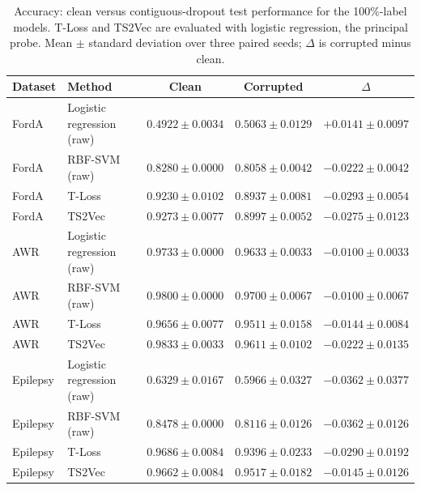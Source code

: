 \documentclass[a4paper,11pt]{article}
\begin{document}
\begin{table}[htbp]
    \centering
    \small
    \begin{tabular}{l l c c c}
        \toprule
        Dataset & Method & Clean & Corrupted & $\Delta$ \\
        \midrule
        FordA & Logistic regression (raw) & $0.4922 \pm 0.0034$ & $0.5063 \pm 0.0129$ & $+0.0141 \pm 0.0097$ \\
        FordA & RBF-SVM (raw)             & $0.8280 \pm 0.0000$ & $0.8058 \pm 0.0042$ & $-0.0222 \pm 0.0042$ \\
        FordA & T-Loss                    & $0.9230 \pm 0.0102$ & $0.8937 \pm 0.0081$ & $-0.0293 \pm 0.0054$ \\
        FordA & TS2Vec                    & $0.9273 \pm 0.0077$ & $0.8997 \pm 0.0052$ & $-0.0275 \pm 0.0123$ \\
        \midrule
        AWR & Logistic regression (raw) & $0.9733 \pm 0.0000$ & $0.9633 \pm 0.0033$ & $-0.0100 \pm 0.0033$ \\
        AWR & RBF-SVM (raw)             & $0.9800 \pm 0.0000$ & $0.9700 \pm 0.0067$ & $-0.0100 \pm 0.0067$ \\
        AWR & T-Loss                    & $0.9656 \pm 0.0077$ & $0.9511 \pm 0.0158$ & $-0.0144 \pm 0.0084$ \\
        AWR & TS2Vec                    & $0.9833 \pm 0.0033$ & $0.9611 \pm 0.0102$ & $-0.0222 \pm 0.0135$ \\
        \midrule
        Epilepsy & Logistic regression (raw) & $0.6329 \pm 0.0167$ & $0.5966 \pm 0.0327$ & $-0.0362 \pm 0.0377$ \\
        Epilepsy & RBF-SVM (raw)             & $0.8478 \pm 0.0000$ & $0.8116 \pm 0.0126$ & $-0.0362 \pm 0.0126$ \\
        Epilepsy & T-Loss                    & $0.9686 \pm 0.0084$ & $0.9396 \pm 0.0233$ & $-0.0290 \pm 0.0192$ \\
        Epilepsy & TS2Vec                    & $0.9662 \pm 0.0084$ & $0.9517 \pm 0.0182$ & $-0.0145 \pm 0.0126$ \\
        \bottomrule
    \end{tabular}
    \caption{Accuracy: clean versus contiguous-dropout test performance for the 100\%-label models. T-Loss and TS2Vec are evaluated with logistic regression, the principal probe. Mean $\pm$ standard deviation over three paired seeds; $\Delta$ is corrupted minus clean.}
    \label{tab:dropout}
\end{table}
\end{document}
